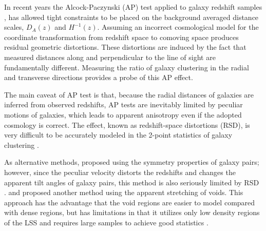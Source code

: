 \documentclass[prl,twocolumn,superscriptaddress,aps,amsmath,amssymb,nofootinbib,altaffilletter]{revtex4}
\begin{document}
In recent years the Alcock-Paczynski (AP) test \citep{AP1979} applied to galaxy redshift samples \citep{Outram2004,Blake2011,Alam2016}, 
has allowed tight constraints to be placed on the background averaged distance scales, $D_A(z)$ and $H^{-1}(z)$.  
Assuming an incorrect cosmological model for the coordinate transformation from redshift space to comoving space produces residual geometric distortions. 
These distortions are induced by the fact that measured distances along 
and perpendicular to the line of sight are fundamentally different. 
Measuring the ratio of galaxy clustering in the radial and transverse directions provides a probe of this AP effect.


The main caveat of AP test is that,
because the radial distances of galaxies are inferred from observed redshifts,
AP tests are inevitably limited by peculiar motions of galaxies,
which leads to apparent anisotropy even if the adopted cosmology is correct.
The effect, known as redshift-space distortions (RSD),
is very difficult to be accurately modeled in the 2-point statistics of galaxy clustering \citep{Ballinger1996}.

As alternative methods, \cite{Marinoni2010} proposed using the symmetry properties of galaxy pairs;
however, since the peculiar velocity distorts the redshifts and changes the apparent tilt angles of galaxy pairs,
this method is also seriously limited by RSD \citep{Jennings2011}.
\cite{Ryden1995} and \cite{LavausWandelt1995} proposed another method using the apparent stretching of voids.
This approach has the advantage that the void regions are easier to model compared with dense regions,
but has limitations in that it utilizes only low density regions of the LSS and requires large samples to achieve good statistics \citep{Qingqing2016}.

\end{document}
